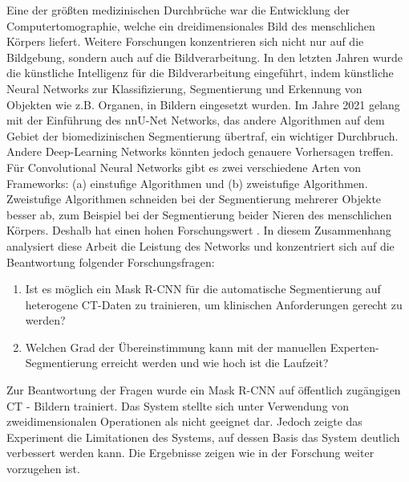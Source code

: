 Eine der größten medizinischen Durchbrüche war die Entwicklung der Computertomographie, welche ein dreidimensionales Bild des menschlichen Körpers liefert. Weitere Forschungen konzentrieren sich nicht nur auf die Bildgebung, sondern auch auf die Bildverarbeitung. In den letzten Jahren wurde die künstliche Intelligenz  für die Bildverarbeitung eingeführt, indem künstliche Neural Networks zur Klassifizierung, Segmentierung und Erkennung von Objekten wie z.B. Organen, in Bildern eingesetzt wurden. Im Jahre 2021 gelang  \cite{Isensee.2021} mit der Einführung des nnU-Net Networks, das andere Algorithmen auf dem Gebiet der biomedizinischen Segmentierung übertraf, ein wichtiger Durchbruch. Andere Deep-Learning Networks könnten jedoch genauere Vorhersagen treffen. Für Convolutional Neural Networks gibt es zwei verschiedene Arten von Frameworks: (a) einstufige Algorithmen und (b) zweistufige Algorithmen. Zweistufige Algorithmen schneiden bei der Segmentierung mehrerer Objekte besser ab, zum Beispiel bei der Segmentierung beider Nieren des menschlichen Körpers. Deshalb hat   \cite{He.op.2017} einen hohen Forschungswert \cite{Shu.2020}. In diesem Zusammenhang analysiert diese Arbeit die Leistung des  Networks und konzentriert sich auf die Beantwortung folgender Forschungsfragen:

\begin{enumerate}
    \item Ist es möglich ein Mask R-CNN für die automatische Segmentierung auf heterogene CT-Daten zu trainieren, um klinischen Anforderungen gerecht zu werden?
    \item Welchen Grad der Übereinstimmung kann mit der manuellen Experten-Segmentierung erreicht werden und wie hoch ist die Laufzeit?
\end{enumerate}

Zur Beantwortung der Fragen wurde ein Mask R-CNN auf öffentlich zugängigen CT - Bildern trainiert. Das System stellte sich unter Verwendung von zweidimensionalen Operationen als nicht geeignet dar. Jedoch zeigte das Experiment die Limitationen des Systems, auf dessen Basis das System deutlich verbessert werden kann. Die Ergebnisse zeigen wie in der Forschung weiter vorzugehen ist.